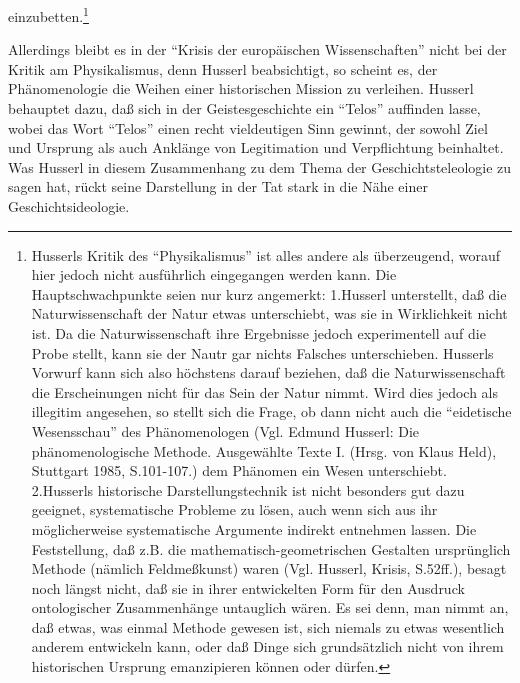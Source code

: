 einzubetten.\footnote{Husserls Kritik des "`Physikalismus"' ist alles andere
  als überzeugend, worauf hier jedoch nicht ausführlich eingegangen werden
  kann.  Die Hauptschwachpunkte seien nur kurz angemerkt: 1.Husserl
  unterstellt, daß die Naturwissenschaft der Natur etwas unterschiebt, was sie
  in Wirklichkeit nicht ist. Da die Naturwissenschaft ihre Ergebnisse jedoch
  experimentell auf die Probe stellt, kann sie der Nautr gar nichts Falsches
  unterschieben. Husserls Vorwurf kann sich also höchstens darauf beziehen,
  daß die Naturwissenschaft die Erscheinungen nicht für das Sein der Natur
  nimmt. Wird dies jedoch als illegitim angesehen, so stellt sich die Frage,
  ob dann nicht auch die "`eidetische Wesensschau"' des Phänomenologen (Vgl.
  Edmund Husserl: Die phänomenologische Methode.  Ausgewählte Texte I. (Hrsg.
  von Klaus Held), Stuttgart 1985, S.101-107.) dem Phänomen ein Wesen
  unterschiebt.  2.Husserls historische Darstellungstechnik ist nicht
  besonders gut dazu geeignet, systematische Probleme zu lösen, auch wenn sich
  aus ihr möglicherweise systematische Argumente indirekt entnehmen lassen.
  Die Feststellung, daß z.B. die mathematisch-geometrischen Gestalten
  ursprünglich Methode (nämlich Feldmeßkunst) waren (Vgl. Husserl, Krisis,
  S.52ff.), besagt noch längst nicht, daß sie in ihrer entwickelten Form für
  den Ausdruck ontologischer Zusammenhänge untauglich wären. Es sei denn, man
  nimmt an, daß etwas, was einmal Methode gewesen ist, sich niemals zu etwas
  wesentlich anderem entwickeln kann, oder daß Dinge sich grundsätzlich nicht
  von ihrem historischen Ursprung emanzipieren können oder dürfen.}

Allerdings bleibt es in der "`Krisis der europäischen Wissenschaften"' nicht
bei der Kritik am Physikalismus, denn Husserl beabsichtigt, so scheint es, der
Phänomenologie die Weihen einer historischen Mission zu verleihen. Husserl
behauptet dazu, daß sich in der Geistesgeschichte ein "`Telos"' auf\/finden
lasse, wobei das Wort "`Telos"' einen recht vieldeutigen Sinn gewinnt, der
sowohl Ziel und Ursprung als auch Anklänge von Legitimation und Verpflichtung
beinhaltet. Was Husserl in diesem Zusammenhang zu dem Thema der
Geschichtsteleologie zu sagen hat, rückt seine Darstellung in der Tat
stark in die Nähe einer Geschichtsideologie.

